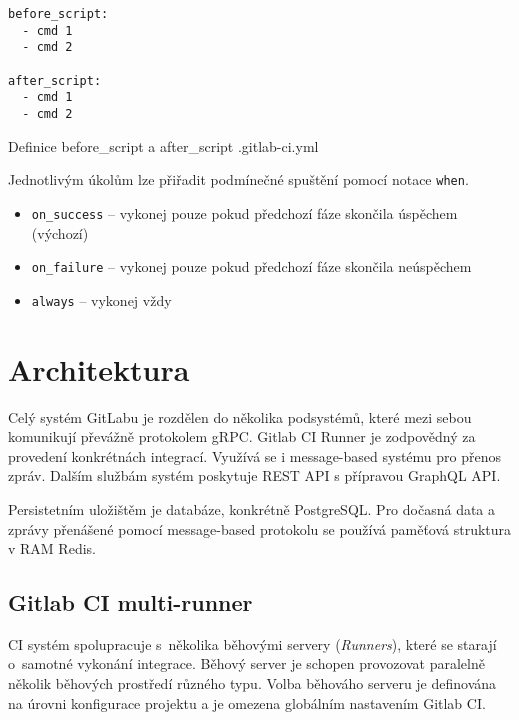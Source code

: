 \begin{listing}[ht]
\begin{verbatim}
before_script:
  - cmd 1
  - cmd 2

after_script:
  - cmd 1
  - cmd 2
\end{verbatim}
\caption{Definice before\_script a after\_script .gitlab-ci.yml}
\end{listing}

Jednotlivým úkolům lze přiřadit podmínečné spuštění pomocí notace \verb|when|.

\begin{itemize}
  \item \verb|on_success| -- vykonej pouze pokud předchozí fáze skončila úspěchem (výchozí) 
  \item \verb|on_failure| -- vykonej pouze pokud předchozí fáze skončila neúspěchem
  \item \verb|always| -- vykonej vždy
\end{itemize}

\section{Architektura}

Celý systém GitLabu je rozdělen do několika podsystémů, které mezi sebou komunikují převážně protokolem gRPC.
Gitlab CI Runner je zodpovědný za provedení konkrétnách integrací.
Využívá se i message-based systému pro přenos zpráv.
Dalším službám systém poskytuje REST API s přípravou GraphQL API.
\cite{gitlab_architecture}
\cite{gitlab_api}

Persistetním uložištěm je databáze, konkrétně PostgreSQL.
Pro dočasná data a zprávy přenášené pomocí message-based protokolu se používá paměťová struktura v RAM Redis.

\subsection{Gitlab CI multi-runner}

CI systém spolupracuje s~několika běhovými servery (\textit{Runners}), které se starají o~samotné vykonání integrace.
Běhový server je schopen provozovat paralelně několik běhových prostředí různého typu.
Volba běhováho serveru je definována na úrovni konfigurace projektu a je omezena globálním nastavením Gitlab CI.


